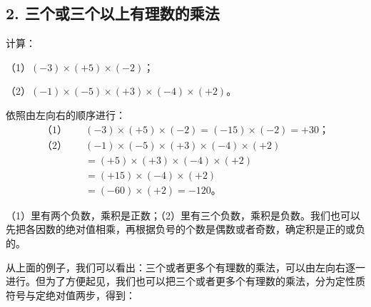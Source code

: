 \subsection{2. 三个或三个以上有理数的乘法}

 计算：
\par\smallskip
（1）\((-3) \times (+5) \times (-2)\)；
\par\smallskip
（2）\((-1) \times (-5) \times (+3) \times (-4) \times (+2)\)。

 依照由左向右的顺序进行：
\begin{align*}
\text{（1）}\quad & (-3) \times (+5) \times (-2) = (-15) \times (-2) = +30；\\[6pt]
\text{（2）}\quad & (-1) \times (-5) \times (+3) \times (-4) \times (+2) \\
&= (+5) \times (+3) \times (-4) \times (+2) \\
&= (+15) \times (-4) \times (+2) \\
&= (-60) \times (+2) = -120。
\end{align*}

 （1）里有两个负数，乘积是正数；（2）里有三个负数，乘积是负数。我们也可以先把各因数的绝对值相乘，再根据负号的个数是偶数或者奇数，确定积是正的或负的。

从上面的例子，我们可以看出：三个或者更多个有理数的乘法，可以由左向右逐一进行。但为了方便起见，我们也可以把三个或者更多个有理数的乘法，分为定性质符号与定绝对值两步，得到：

\begin{center}
\end{center}

